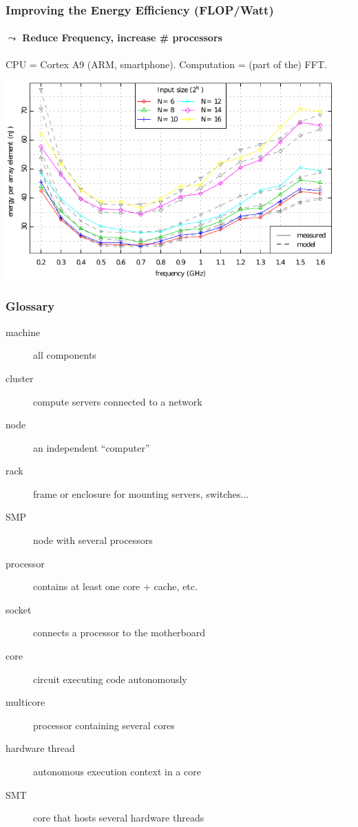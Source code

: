 \documentclass[xcolor={x11names,svgnames,psnames}]{beamer}
\begin{document}
\begin{frame}
  \frametitle{Improving the Energy Efficiency (FLOP/Watt)}
  \framesubtitle{$\leadsto$ Reduce Frequency, increase \# processors}

  \centering

  \small CPU = Cortex A9 (ARM, smartphone). Computation = (part of the) FFT. 
  
  \includegraphics[width=\textwidth]{cpu_freq_scaling.pdf}
\end{frame}


\begin{frame}
  \frametitle{Glossary}

    \begin{description}
    \item[machine] all components

    \item[cluster] compute servers connected to a network
      
    \item[node] an independent ``computer''

    \item[rack] frame or enclosure for mounting servers, switches...

    \item[SMP] node with several processors

    \item[processor] contains at least one core + cache, etc.
  
    \item[socket] connects a processor to the motherboard

    \item[core] circuit executing code autonomously

    \item[multicore] processor containing several cores
  
    \item[hardware thread] autonomous execution context in a core

    \item[SMT] core that hosts several hardware threads
    \end{description}

\end{frame}
\end{document}
